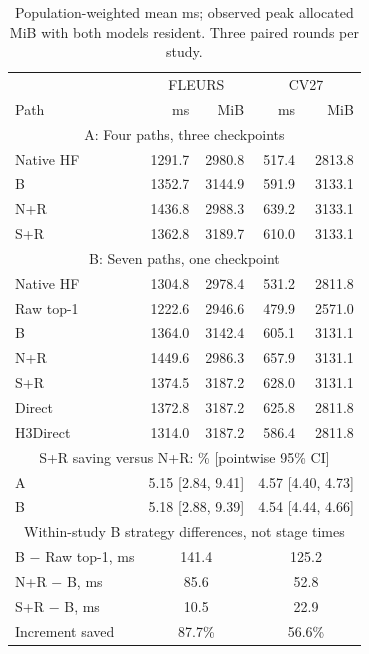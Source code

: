 \begin{table}[!b]\centering\footnotesize
\caption{Population-weighted mean ms; observed peak allocated MiB with both models resident. Three paired rounds per study.}\label{tab:cost}
\setlength{\tabcolsep}{4pt}\renewcommand{\arraystretch}{1.03}
\begin{tabular}{@{}lrrrr@{}}\toprule
 & \multicolumn{2}{c}{FLEURS} & \multicolumn{2}{c}{CV27}\\
Path & ms & MiB & ms & MiB\\\midrule
\multicolumn{5}{c}{A: Four paths, three checkpoints}\\
Native HF & 1291.7 & 2980.8 & 517.4 & 2813.8\\
B & 1352.7 & 3144.9 & 591.9 & 3133.1\\
N+R & 1436.8 & 2988.3 & 639.2 & 3133.1\\
S+R & 1362.8 & 3189.7 & 610.0 & 3133.1\\
\midrule
\multicolumn{5}{c}{B: Seven paths, one checkpoint}\\
Native HF & 1304.8 & 2978.4 & 531.2 & 2811.8\\
Raw top-1 & 1222.6 & 2946.6 & 479.9 & 2571.0\\
B & 1364.0 & 3142.4 & 605.1 & 3131.1\\
N+R & 1449.6 & 2986.3 & 657.9 & 3131.1\\
S+R & 1374.5 & 3187.2 & 628.0 & 3131.1\\
Direct & 1372.8 & 3187.2 & 625.8 & 2811.8\\
H3Direct & 1314.0 & 3187.2 & 586.4 & 2811.8\\
\midrule
\multicolumn{5}{c}{S+R saving versus N+R: \% [pointwise 95\% CI]}\\
A & \multicolumn{2}{c}{5.15 [2.84, 9.41]} & \multicolumn{2}{c}{4.57 [4.40, 4.73]}\\
B & \multicolumn{2}{c}{5.18 [2.88, 9.39]} & \multicolumn{2}{c}{4.54 [4.44, 4.66]}\\
\midrule
\multicolumn{5}{c}{Within-study B strategy differences, not stage times}\\
B $-$ Raw top-1, ms & \multicolumn{2}{c}{141.4} & \multicolumn{2}{c}{125.2}\\
N+R $-$ B, ms & \multicolumn{2}{c}{85.6} & \multicolumn{2}{c}{52.8}\\
S+R $-$ B, ms & \multicolumn{2}{c}{10.5} & \multicolumn{2}{c}{22.9}\\
Increment saved & \multicolumn{2}{c}{87.7\%} & \multicolumn{2}{c}{56.6\%}\\
\bottomrule\end{tabular}\end{table}
